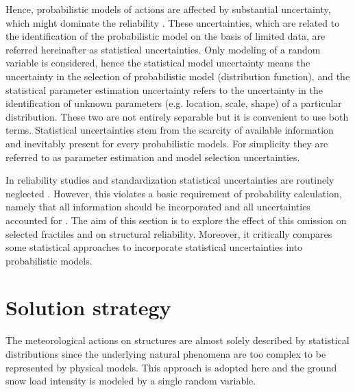 Hence, probabilistic models of actions are affected by substantial uncertainty, which might dominate the reliability \citep{Coles2003catastrophes}. These uncertainties, which are related to the identification of the probabilistic model on the basis of limited data, are referred hereinafter as statistical uncertainties. Only modeling of a random variable is considered, hence the statistical model uncertainty means the uncertainty in the selection of probabilistic model (distribution function), and the statistical parameter estimation uncertainty refers to the uncertainty in the identification of unknown parameters (e.g. location, scale, shape) of a particular distribution. These two are not entirely separable but it is convenient to use both terms. Statistical uncertainties stem from the scarcity of available information and inevitably present for every probabilistic models. For simplicity they are referred to as parameter estimation and model selection uncertainties.

In reliability studies and standardization statistical uncertainties are routinely neglected \citep{Sanpaolesi1998, Coles2003fully_prob, Sisson2006}. However, this violates a basic requirement of probability calculation, namely that all information should be incorporated and all uncertainties accounted for \citep{Kiureghian1989}. The aim of this section is to explore the effect of this omission on selected fractiles and on structural reliability. Moreover, it critically compares some statistical approaches to incorporate statistical uncertainties into probabilistic models.



\section{Solution strategy}
The meteorological actions on structures are almost solely described by statistical distributions since the underlying natural phenomena are too complex to be represented by physical models. This approach is adopted here and the ground snow load intensity is modeled by a single random variable.
  
